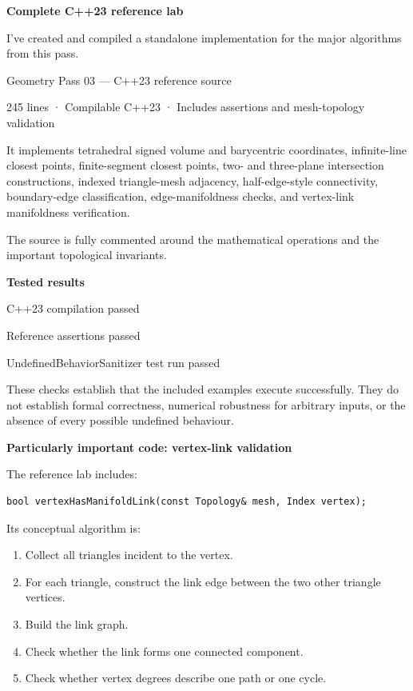 \textbf{Complete C++23 reference lab}

I've created and compiled a standalone implementation for the major algorithms from this pass.

Geometry Pass 03 --- C++23 reference source

245 lines · Compilable C++23 · Includes assertions and mesh-topology validation

It implements tetrahedral signed volume and barycentric coordinates, infinite-line closest points, finite-segment closest points, two- and three-plane intersection constructions, indexed triangle-mesh adjacency, half-edge-style connectivity, boundary-edge classification, edge-manifoldness checks, and vertex-link manifoldness verification.

The source is fully commented around the mathematical operations and the important topological invariants.

\textbf{Tested results}

C++23 compilation passed

Reference assertions passed

UndefinedBehaviorSanitizer test run passed

These checks establish that the included examples execute successfully. They do not establish formal correctness, numerical robustness for arbitrary inputs, or the absence of every possible undefined behaviour.

\textbf{Particularly important code: vertex-link validation}

The reference lab includes:

\begin{verbatim}
bool vertexHasManifoldLink(const Topology& mesh, Index vertex);
\end{verbatim}

Its conceptual algorithm is:

\begin{enumerate}
\def\labelenumi{\arabic{enumi}.}
\tightlist
\item
  Collect all triangles incident to the vertex.
\item
  For each triangle, construct the link edge between the two other triangle vertices.
\item
  Build the link graph.
\item
  Check whether the link forms one connected component.
\item
  Check whether vertex degrees describe one path or one cycle.
\end{enumerate}

